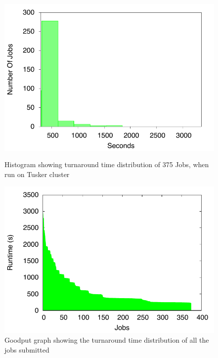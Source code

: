 \documentclass[ms,electronic,double]{nuthesis}
\begin{document}
\begin{figure}[h!]
\begin{center}
\includegraphics{images/coscheduler_histogram}
\caption{Histogram showing turnaround time distribution of 375 Jobs, when run on Tusker cluster}
\label{fig:coscheduler_histogram}
\end{center}

\begin{center}
\includegraphics{images/coscheduler_jobgoodput}
\caption{Goodput graph showing the turnaround time distribution of all the jobs submitted}
\label{fig:coscheduler_jobgoodput}
\end{center}

\end{figure}
\FloatBarrier
\end{document}
